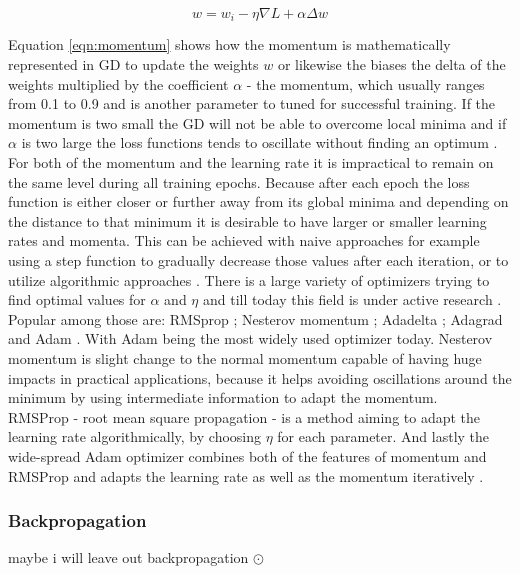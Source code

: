\begin{equation}
  w = w_i - \eta \nabla L + \alpha \Delta w
  \label{eqn:momentum}
\end{equation}

Equation \ref{eqn:momentum} shows how the momentum is mathematically represented in GD to update the weights $w$ or
likewise the biases the delta of the weights multiplied by the coefficient $\alpha$ - the momentum, which usually ranges
from 0.1 to 0.9 and is another parameter to tuned for successful training. If the momentum is two small the GD will not
be able to overcome local minima and if $\alpha$ is two large the loss functions tends to oscillate without finding an
optimum \cite{lecun2015deep}.  For both of the momentum and the learning rate it is impractical to remain on the same
level during all training epochs. Because after each epoch the loss function is either closer or further away from its
global minima and depending on the distance to that minimum it is desirable to have larger or smaller learning rates and
momenta. This can be achieved with naive approaches for example using a step function to gradually decrease those values
after each iteration, or to utilize algorithmic approaches \cite{michie1994machine}.  There is a large variety of
optimizers trying to find optimal values for $\alpha$ and $\eta$ and till today this field is under active research
\cite{goodfellow2016deep}. Popular among those are: RMSprop \cite{hinton2012neural}; Nesterov momentum
\cite{dozat2016incorporating}; Adadelta \cite{zeiler2012adadelta}; Adagrad \cite{ruder2016overview} and Adam
\cite{kingma2014adam}. With Adam being the most widely used optimizer today.  Nesterov momentum is slight change to the
normal momentum capable of having huge impacts in practical applications, because it helps avoiding oscillations around the minimum by using intermediate information to adapt the momentum. \\
RMSProp - root mean square propagation - is a method aiming to adapt the learning rate algorithmically, by choosing
$\eta$ for each parameter.  And lastly the wide-spread Adam optimizer combines both of the features of momentum and
RMSProp and adapts the learning rate as well as the momentum iteratively \cite{kingma2014adam}.


\subsubsection{Backpropagation}
maybe i will leave out backpropagation
$\odot$

